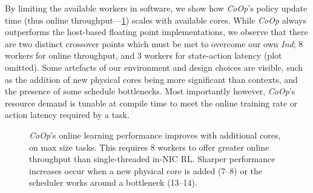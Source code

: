 \documentclass[
conference
,10pt
]{IEEEtran}
\newcommand{\Coopfw}{\emph{CoOp}}
\newcommand{\Indfw}{\emph{Ind}}
\begin{document}
By limiting the available workers in software, we show how \Coopfw{}'s policy update time (thus  online throughput---\cref{fig:vary-core}) scales with available cores.
While \Coopfw{} always outperforms the host-based floating point implementations, we observe that there are two distinct crossover points which must be met to overcome our own \Indfw{}; \num{8} workers for online throughput, and \num{3} workers for state-action latency (plot omitted).
Some artefacts of our environment and design choices are visible, such as the addition of new physical cores being more significant than contexts, and the presence of some schedule bottlenecks.
Most importantly however, \Coopfw{}'s resource demand is tunable at compile time to meet the online training rate or action latency required by a task.

\begin{figure}[t]
	\centering
	\caption{
		\Coopfw{}'s online learning performance improves with additional cores, on max size tasks. This requires \num{8} workers to offer greater online throughput than single-threaded in-NIC RL. Sharper performance increases occur when a new physical core is added (\numrange{7}{8}) or the scheduler works around a bottleneck (\numrange{13}{14}).\label{fig:vary-core}}
\end{figure}

\end{document}
